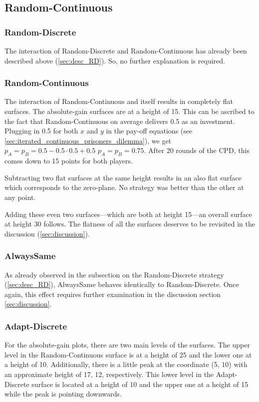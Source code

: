 \documentclass[11pt]{article}
\begin{document}
\subsection{Random-Continuous} \label{sec:desc_RC}

\subsubsection*{Random-Discrete}
	The interaction of Random-Discrete and Random-Continuous has already been described above (\ref{sec:desc_RD}).
	So, no further explanation is required.

\subsubsection*{Random-Continuous}
	The interaction of Random-Continuous and itself results in completely flat surfaces.
	The absolute-gain surfaces are at a height of 15.
	This can be ascribed to the fact that Random-Continuous on average delivers 0.5 as an investment.
	Plugging in 0.5 for both $x$ and $y$ in the pay-off equations (see \ref{sec:iterated_continuous_prisoners_dilemma}), we get $p_A = p_B = 0.5 - 0.5 \cdot 0.5 + 0.5$ \textrightarrow $p_A = p_B = 0.75$.
	After 20 rounds of the CPD, this comes down to 15 points for both players.

	Subtracting two flat surfaces at the same height results in an also flat surface which corresponds to the zero-plane.
	No strategy was better than the other at any point.

	Adding these even two surfaces---which are both at height 15---an overall surface at height 30 follows.
	The flatness of all the surfaces deserves to be revisited in the discussion (\ref{sec:discussion}).

\subsubsection*{AlwaysSame}
	As already observed in the subsection on the Random-Discrete strategy (\ref{sec:desc_RD}), AlwaysSame behaves identically to Random-Discrete.
	Once again, this effect requires further examination in the discussion section \ref{sec:discussion}.

\subsubsection*{Adapt-Discrete}
	For the absolute-gain plots, there are two main levels of the surfaces.
	The upper level in the Random-Continuous surface is at a height of 25 and the lower one at a height of 10.
	Additionally, there is a little peak at the coordinate (5, 10) with an approximate height of 17, 12, respectively.
	This lower level in the Adapt-Discrete surface is located at a height of 10 and the upper one at a height of 15 while the peak is pointing downwards.
\end{document}
